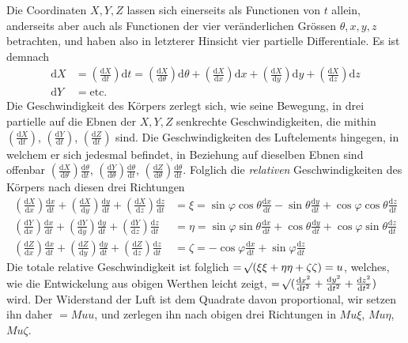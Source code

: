 \par\clearpage
{}
Die Coordinaten $X,Y,Z$ lassen sich einerseits als Functionen von $t$ allein, anderseits aber auch als Functionen der vier veränderlichen Grössen $\theta,x,y,z$ betrachten, und haben also in letzterer Hinsicht vier partielle Differentiale. Es ist demnach
\[
\begin{aligned}
\mathrm{d}X&=(\tfrac{\mathrm{d}X}{\mathrm{d}t})\mathrm{d}t=(\tfrac{\mathrm{d}X}{\mathrm{d}\theta})\mathrm{d}\theta+(\tfrac{\mathrm{d}X}{\mathrm{d}x})\mathrm{d}x+(\tfrac{\mathrm{d}X}{\mathrm{d}y})\mathrm{d}y+(\tfrac{\mathrm{d}X}{\mathrm{d}z})\mathrm{d}z\\
\mathrm{d}Y&=\mathrm{etc.}
\end{aligned}
\]
Die Geschwindigkeit des Körpers zerlegt sich, wie seine Bewegung, in drei partielle auf die Ebnen der $X,Y,Z$ senkrechte Geschwindigkeiten, die mithin $(\tfrac{\mathrm{d}X}{\mathrm{d}t})$, $(\tfrac{\mathrm{d}Y}{\mathrm{d}t})$, $(\tfrac{\mathrm{d}Z}{\mathrm{d}t})$ sind. Die Geschwindigkeiten des Luftelements hingegen, in welchem er sich jedesmal befindet, in Beziehung auf dieselben Ebnen sind offenbar $(\tfrac{\mathrm{d}X}{\mathrm{d}\theta})\tfrac{\mathrm{d}\theta}{\mathrm{d}t}$, $(\tfrac{\mathrm{d}Y}{\mathrm{d}\theta})\tfrac{\mathrm{d}\theta}{\mathrm{d}t}$, $(\tfrac{\mathrm{d}Z}{\mathrm{d}\theta})\tfrac{\mathrm{d}\theta}{\mathrm{d}t}$. Folglich die \textit{relativen} Geschwindigkeiten des Körpers nach diesen drei Richtungen
\[
\begin{aligned}
(\tfrac{\mathrm{d}X}{\mathrm{d}x})\tfrac{\mathrm{d}x}{\mathrm{d}t}+(\tfrac{\mathrm{d}X}{\mathrm{d}y})\tfrac{\mathrm{d}y}{\mathrm{d}t}+(\tfrac{\mathrm{d}X}{\mathrm{d}z})\tfrac{\mathrm{d}z}{\mathrm{d}t}&=\xi=\sin\varphi\cos\theta\tfrac{\mathrm{d}x}{\mathrm{d}t}-\sin\theta\tfrac{\mathrm{d}y}{\mathrm{d}t}+\cos\varphi\cos\theta\tfrac{\mathrm{d}z}{\mathrm{d}t}\\
(\tfrac{\mathrm{d}Y}{\mathrm{d}x})\tfrac{\mathrm{d}x}{\mathrm{d}t}+(\tfrac{\mathrm{d}Y}{\mathrm{d}y})\tfrac{\mathrm{d}y}{\mathrm{d}t}+(\tfrac{\mathrm{d}Y}{\mathrm{d}z})\tfrac{\mathrm{d}z}{\mathrm{d}t}&=\eta=\sin\varphi\sin\theta\tfrac{\mathrm{d}x}{\mathrm{d}t}+\cos\theta\tfrac{\mathrm{d}y}{\mathrm{d}t}+\cos\varphi\sin\theta\tfrac{\mathrm{d}z}{\mathrm{d}t}\\
(\tfrac{\mathrm{d}Z}{\mathrm{d}x})\tfrac{\mathrm{d}x}{\mathrm{d}t}+(\tfrac{\mathrm{d}Z}{\mathrm{d}y})\tfrac{\mathrm{d}y}{\mathrm{d}t}+(\tfrac{\mathrm{d}Z}{\mathrm{d}z})\tfrac{\mathrm{d}z}{\mathrm{d}t}&=\zeta=-\cos\varphi\tfrac{\mathrm{d}x}{\mathrm{d}t}+\sin\varphi\tfrac{\mathrm{d}z}{\mathrm{d}t}
\end{aligned}
\]
Die totale relative Geschwindigkeit ist folglich $=\mathord{{}^{}\!\surd}(\xi\xi+\eta\eta+\zeta\zeta)=u$, welches, wie die Entwickelung aus obigen Werthen leicht zeigt, $=\mathord{{}^{}\!\surd}(\tfrac{\mathrm{d}x^2}{\mathrm{d}t^2}+\tfrac{\mathrm{d}y^2}{\mathrm{d}t^2}+\tfrac{\mathrm{d}z^2}{\mathrm{d}t^2})$ wird. Der Widerstand der Luft ist dem Quadrate davon proportional, wir setzen ihn daher $=Muu$, und zerlegen ihn nach obigen drei Richtungen in $Mu\xi$, $Mu\eta$, $Mu\zeta$.

